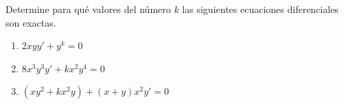 \item Determine para qué valores del número $k$ las siguientes ecuaciones diferenciales son exactas.
    \begin{enumerate}
        \item[(a)] $2xyy' + y^k = 0$
        \item[(b)] $8x^3y^3y' + kx^2y^4 = 0$
        \item[(c)] $(xy^2 + kx^2y) + (x + y)x^2y' = 0$
    \end{enumerate}

